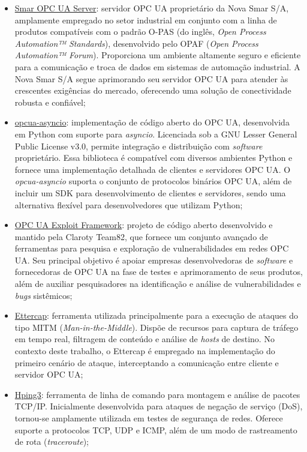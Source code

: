         \begin{itemize}
            \item \underline{Smar OPC UA Server}: servidor OPC UA proprietário da Nova Smar S/A, amplamente empregado no setor industrial em conjunto com a linha de produtos compatíveis com o padrão O-PAS (do inglês, \textit{Open Process Automation™ Standards}), desenvolvido pelo OPAF (\textit{Open Process Automation™ Forum}). Proporciona um ambiente altamente seguro e eficiente para a comunicação e troca de dados em sistemas de automação industrial. A Nova Smar S/A segue aprimorando seu servidor OPC UA para atender às crescentes exigências do mercado, oferecendo uma solução de conectividade robusta e confiável;
            \item \underline{opcua-asyncio}: implementação de código aberto do OPC UA, desenvolvida em Python com suporte para \textit{asyncio}. Licenciada sob a GNU Lesser General Public License v3.0, permite integração e distribuição com \textit{software} proprietário. Essa biblioteca é compatível com diversos ambientes Python e fornece uma implementação detalhada de clientes e servidores OPC UA. O \textit{opcua-asyncio} suporta o conjunto de protocolos binários OPC UA, além de incluir um SDK para desenvolvimento de clientes e servidores, sendo uma alternativa flexível para desenvolvedores que utilizam Python;
            \item \underline{OPC UA Exploit Framework}: projeto de código aberto desenvolvido e mantido pela Claroty Team82, que fornece um conjunto avançado de ferramentas para pesquisa e exploração de vulnerabilidades em redes OPC UA. Seu principal objetivo é apoiar empresas desenvolvedoras de \textit{software} e fornecedoras de OPC UA na fase de testes e aprimoramento de seus produtos, além de auxiliar pesquisadores na identificação e análise de vulnerabilidades e \textit{bugs} sistêmicos;
            \item \underline{Ettercap}: ferramenta utilizada principalmente para a execução de ataques do tipo MITM (\textit{Man-in-the-Middle}). Dispõe de recursos para captura de tráfego em tempo real, filtragem de conteúdo e análise de \textit{hosts} de destino. No contexto deste trabalho, o Ettercap é empregado na implementação do primeiro cenário de ataque, interceptando a comunicação entre cliente e servidor OPC UA;
            \item \underline{Hping3}: ferramenta de linha de comando para montagem e análise de pacotes TCP/IP. Inicialmente desenvolvida para ataques de negação de serviço (DoS), tornou-se amplamente utilizada em testes de segurança de redes. Oferece suporte a protocolos TCP, UDP e ICMP, além de um modo de rastreamento de rota (\textit{traceroute});

\end{itemize}
